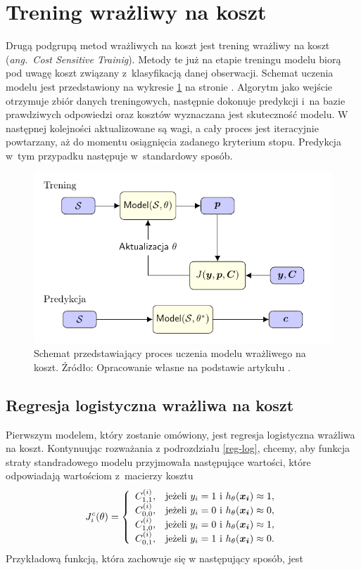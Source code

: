 \documentclass[inzynierska]{pwr_wmat_praca_dyplomowa}
\theoremstyle{plain}
\numberwithin{theorem}{chapter}
\theoremstyle{definition}
\numberwithin{theorem}{chapter}
\begin{document}
\section{Trening wrażliwy na koszt}
Drugą podgrupą metod wrażliwych na koszt jest trening wrażliwy na koszt (\textit{ang.~Cost Sensitive Trainig}). Metody te już na etapie treningu modelu biorą pod uwagę koszt związany z~klasyfikacją danej obserwacji. Schemat uczenia modelu jest przedstawiony na wykresie \ref{cst} na stronie \pageref{cst}. Algorytm jako wejście otrzymuje zbiór danych treningowych, następnie dokonuje predykcji i~na bazie prawdziwych odpowiedzi oraz kosztów wyznaczana jest skuteczność modelu. W następnej kolejności aktualizowane są wagi, a cały proces jest iteracyjnie powtarzany, aż do momentu osiągnięcia zadanego kryterium stopu. Predykcja w~tym przypadku następuje w~standardowy sposób.
\begin{figure}[h]
	\includegraphics[width=\linewidth]{plots/cost_sensitive_training.pdf}
	\caption{Schemat przedstawiający proces uczenia modelu wrażliwego na koszt. Źródło: Opracowanie własne na podstawie artykułu \cite{RMoser}.}
	\label{cst}
\end{figure}	

\subsection{Regresja logistyczna wrażliwa na koszt}
\label{cslr}
Pierwszym modelem, który zostanie omówiony, jest regresja logistyczna wrażliwa na koszt. Kontynuując rozważania z podrozdziału \ref{reg-log}, chcemy, aby funkcja straty standradowego modelu przyjmowała następujące wartości, które odpowiadają wartościom z~macierzy kosztu
$$
J^c_i(\theta)=\left\{
\begin{array}{rl}
C^{(i)}_{1,1}, &\mbox{jeżeli $y_i = 1$ i $h_{\theta}(\boldsymbol{x_i}) \approx 1$}, \\
C^{(i)}_{0,0}, &\mbox{jeżeli $y_i = 0$ i $h_{\theta}(\boldsymbol{x_i}) \approx 0$}, \\
C^{(i)}_{1,0}, &\mbox{jeżeli $y_i = 0$ i $h_{\theta}(\boldsymbol{x_i}) \approx 1$}, \\
C^{(i)}_{0,1}, &\mbox{jeżeli $y_i = 1$ i $h_{\theta}(\boldsymbol{x_i}) \approx 0$}.
\end{array}
\right.
$$
Przykładową funkcją, która zachowuje się w następujący sposób, jest
\end{document}
